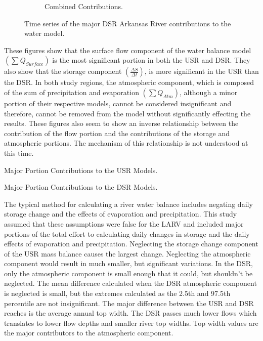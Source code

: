 \begin{figure}[htbp]
\begin{subfigure}{0.5\textwidth}
		\caption{Combined Contributions.}
	\end{subfigure}
	\caption[Time series of the major DSR Arkansas River contributions to the water model.]{Time series of the major DSR Arkansas River contributions to the water model.}
	\label{fig:DSRWaterContrib}
\end{figure}

These figures show that the surface flow component of the water balance model $ \displaystyle \left( \sum Q_{Surface} \right) $ is the most significant portion in both the USR and DSR.  They also show that the storage component $ \displaystyle \left( \frac{\Delta S}{\Delta t} \right) $, is more significant in the USR than the DSR.  In both study regions, the atmospheric component, which is composed of the sum of precipitation and evaporation $ \displaystyle \left( \sum Q_{Atm} \right) $, although a minor portion of their respective models, cannot be considered insignificant and therefore, cannot be removed from the model without significantly effecting the results.  These figures also seem to show an inverse relationship between the contribution of the flow portion and the contributions of the storage and atmospheric portions.  The mechanism of this relationship is not understood at this time.

\begin{table}[htbp]
	\centering
	\caption[Major Portion Contributions to the USR Models.]{Major Portion Contributions to the USR Models.}
	\label{tab:USRContrib}
	
\end{table}
\tablevspace
\begin{table}[htbp]
	\centering
	\caption[Major Portion Contributions to the DSR Models.]{Major Portion Contributions to the DSR Models.}
	\label{tab:DSRContrib}
	
\end{table}

The typical method for calculating a river water balance includes negating daily storage change and the effects of evaporation and precipitation.  This study assumed that these assumptions were false for the LARV and included major portions of the total effort to calculating daily changes in storage and the daily effects of evaporation and precipitation.  Neglecting the storage change component of the USR mass balance causes the largest change.  Neglecting the atmospheric component would result in much smaller, but significant variations.  In the DSR, only the atmospheric component is small enough that it could, but shouldn't be neglected.  The mean difference calculated when the DSR atmospheric component is neglected is small, but the extremes calculated as the 2.5th and 97.5th percentile are not insignificant.  The major difference between the USR and DSR reaches is the average annual top width.  The DSR passes much lower flows which translates to lower flow depths and smaller river top widths.  Top width values are the major contributors to the atmospheric component.

